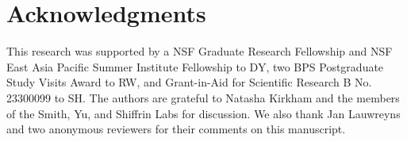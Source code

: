 \documentclass[12pt]{article}
\begin{document}
\section*{Acknowledgments}

This research was supported by a NSF Graduate Research Fellowship and NSF East Asia Pacific Summer Institute Fellowship to DY, two BPS Postgraduate Study Visits Award to RW, and Grant-in-Aid for Scientific Research B No. 23300099 to SH. The authors are grateful to Natasha Kirkham and the members of the Smith, Yu, and Shiffrin Labs for discussion. We also thank Jan Lauwreyns and two anonymous reviewers for their comments on this manuscript.

\clearpage

\end{document}
